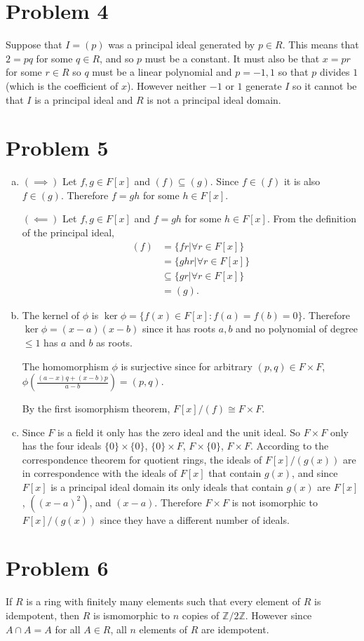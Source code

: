 \documentclass{article}
\begin{document}
\newpage 

\section*{Problem 4}
Suppose that $I = (p)$ was a principal ideal generated by $p \in R$.
This means that $2 = pq$ for some $q \in R$, 
and so $p$ must be a constant.
It must also be that $x = pr$ for some $r \in R$ so $q$ must be a linear polynomial 
and $p = -1,1$ so that $p$ divides $1$(which is the coefficient of $x$).
However neither $-1$ or $1$ generate $I$ so it cannot be that $I$ is a principal ideal
and $R$ is not a principal ideal domain.
\newpage 

\section*{Problem 5}
\begin{enumerate}[(a)]
	\item $(\implies)$ Let $f,g \in F[x]$ and $(f) \subseteq (g)$.
	Since $f \in (f)$ it is also $f \in (g)$.
	Therefore $f = gh$ for some $h \in F[x]$.
	
	$(\impliedby)$ Let $f,g \in F[x]$ and $f = gh$ for some $h \in F[x]$.
	From the definition of the principal ideal,
	\begin{align*}
		(f) &= \{fr|\forall r \in F[x]\} \\
			&= \{ghr|\forall r \in F[x]\} \\
			&\subseteq \{gr|\forall r \in F[x]\} \\
			&= (g).
	\end{align*}
	\item The kernel of $\phi$ is 
	$\ker \phi = \{f(x) \in F[x] \colon f(a) = f(b) = 0\}$.
	Therefore $\ker \phi = (x-a)(x-b)$ since it 
	has roots $a,b$ and no polynomial of degree $\leq 1$
	has $a$ and $b$ as roots.

	The homomorphism $\phi$ is surjective since
	for arbitrary $(p,q) \in F \times F$,
	$\phi\left(\frac{(a-x)q + (x-b)p}{a-b}\right) = (p,q)$.

	By the first isomorphism theorem, $F[x]/(f) \cong F \times F$.

	\item Since $F$ is a field it only has the zero ideal and the unit ideal.
	So $F \times F$ only has the four ideals 
	$\{0\} \times \{0\}$, $\{0\} \times F$,  $F \times \{0\}$, $F \times F$.
	According to the correspondence theorem for quotient rings,
	the ideals of $F[x]/(g(x))$ are in correspondence with 
	 the ideals of $F[x]$ that contain $g(x)$,
	and since $F[x]$ is a principal ideal domain its only ideals 
	that contain $g(x)$ are $F[x]$, $((x-a)^2)$, and $(x-a)$.
	Therefore $F \times F$ is not isomorphic to $F[x]/(g(x))$
	since they have a different number of ideals.
\end{enumerate}
\newpage 

\section*{Problem 6}

If $R$ is a ring with finitely many elements such that 
every element of $R$ is idempotent, then 
$R$ is ismomorphic to $n$ copies of $\mathbb{Z}/2\mathbb{Z}$.
However since $A \cap A = A$ for all $A \in R$,
all $n$ elements of $R$ are idempotent.
\end{document}

